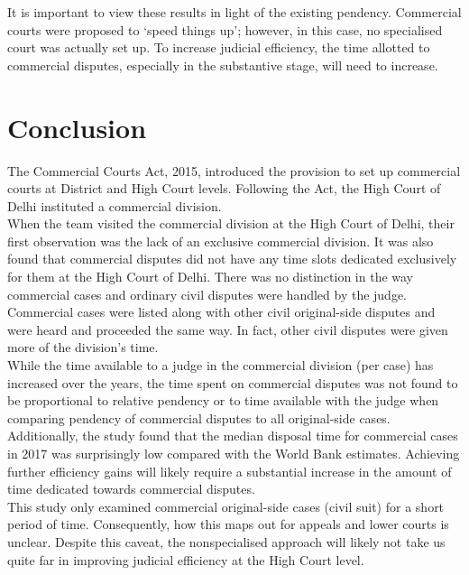 \documentclass[a4paper, 12pt, twoside]{article}
\begin{document}
It is important to view these results in light of the existing pendency. Commercial courts were proposed to ‘speed things up’; however, in this case, no specialised court was actually set up. To increase judicial efficiency, the time allotted to commercial disputes, especially in the substantive stage, will need to increase.  

\section*{Conclusion}

The Commercial Courts Act, 2015, introduced the provision to set up commercial courts at District and High Court levels. Following the Act, the High Court of Delhi instituted a commercial division. \\

When the team visited the commercial division at the High Court of Delhi, their first observation was the lack of an exclusive commercial division. It was also found that commercial disputes did not have any time slots dedicated exclusively for them at the High Court of Delhi. There was no distinction in the way commercial cases and ordinary civil disputes were handled by the judge. Commercial cases were listed along with other civil original-side disputes and were heard and proceeded the same way. In fact, other civil disputes were given more of the division’s time. \\

While the time available to a judge in the commercial division (per case) has increased over the years, the time spent on commercial disputes was not found to be proportional to relative pendency or to time available with the judge when comparing pendency of commercial disputes to all original-side cases. \\

Additionally, the study found that the median disposal time for commercial cases in 2017 was surprisingly low compared with the World Bank estimates. Achieving further efficiency gains will likely require a substantial increase in the amount of time dedicated towards commercial disputes.\\

This study only examined commercial original-side cases (civil suit) for a short period of time. Consequently, how this maps out for appeals and lower courts is unclear. Despite this caveat, the nonspecialised approach will likely not take us quite far in improving judicial efficiency at the High Court level. \\
\end{document}
